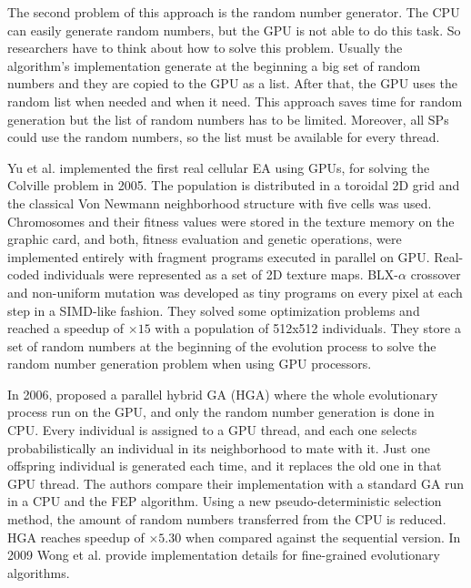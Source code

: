 \documentclass{article}
\begin{document}
The second problem of this approach is the random number
generator. The CPU can easily generate random numbers, but the GPU is
not able to do this task.
So researchers have to think about how to solve this problem. Usually the algorithm's implementation generate at the beginning a big set of random numbers and they are copied to the GPU as a list. After that, the GPU uses the random list when needed and when it need. This approach saves time for random generation but the list of random numbers has to be limited. Moreover, all SPs could use the random numbers, so the list must be available for every
thread.


Yu et al. \cite{yu-parallel-2005} implemented the first real cellular EA using GPUs, for solving the Colville problem \cite{Ng:2005:DFF:1064290.1064296} in 2005. The population is distributed in a toroidal 2D grid and the classical Von Newmann neighborhood structure with five cells was used. Chromosomes and their fitness values were stored in the texture memory on the graphic card, and both, fitness evaluation and genetic operations, were implemented entirely with fragment programs executed in parallel on GPU. Real-coded individuals were represented as a set of 2D texture maps. BLX-$\alpha$ crossover and non-uniform mutation was developed as tiny programs on every pixel at each step in a SIMD-like fashion. They solved some optimization problems and reached a speedup of $\times15$ with a population of 512x512 individuals. They store a set of random numbers at the beginning of the evolution process to solve the random number generation problem when using GPU processors.

In 2006, \cite{man-leung-wong-parallel-2006} proposed a parallel hybrid GA (HGA) where the whole evolutionary process run on the GPU, and only the random number generation is done in CPU. Every individual is assigned to a GPU thread, and each one selects probabilistically an individual in its neighborhood to mate with it. Just one offspring individual is generated each time, and it replaces the old one in that GPU thread. The authors compare their implementation with a standard GA run in a CPU and the FEP \cite{man-leung-wong-parallel-2005} algorithm. Using a new pseudo-deterministic selection method, the amount of random numbers transferred from the CPU is reduced. HGA reaches speedup of $\times5.30$ when compared against the sequential version. In 2009 Wong et al. \cite{wong-implementation-2009} provide implementation details for fine-grained evolutionary algorithms.
\end{document}
